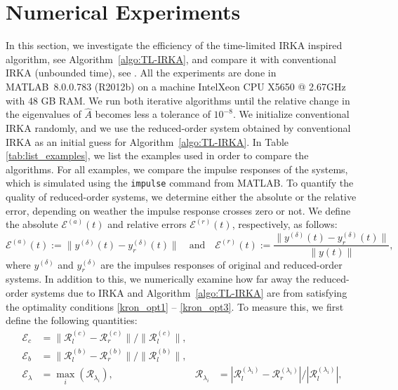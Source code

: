 \documentclass[a4paper,11pt, twoside]{article}
\newcommand{\hA}{\ensuremath{\hat{A}}}
\newcommand{\cE}{\ensuremath{\mathcal{E}}}
\newcommand{\matlab}{MATLAB\textsuperscript{\textregistered}}
\newcommand{\intel}{Intel\textsuperscript{\textregistered}}
\newcommand{\xeon}{Xeon\textsuperscript{\textregistered}}
\begin{document}
%

\section{Numerical Experiments}\label{sec:numericalsection}
In this section, we investigate the efficiency of the time-limited IRKA inspired algorithm, see Algorithm~\ref{algo:TL-IRKA}, and compare it 
with conventional IRKA (unbounded time), see \cite{morGugAB08}. All the experiments are done in \matlab~8.0.0.783 (R2012b) on a machine \intel\xeon 
CPU X5650 @ 2.67GHz with 48 GB RAM. We run both iterative algorithms until the relative change in the eigenvalues of $\hA$ becomes less a 
tolerance of $10^{-8}$. We initialize conventional IRKA randomly, and we use the reduced-order system obtained by conventional 
IRKA as an initial guess for Algorithm~\ref{algo:TL-IRKA}.  In Table \ref{tab:list_examples}, we list the examples used in order to compare the 
algorithms. For all examples, we compare the impulse responses of the systems, which is simulated using the \texttt{impulse} command from MATLAB. To 
quantify the quality of reduced-order systems, we determine either the absolute or the relative error, depending on weather the impulse response 
crosses zero or not. We define the absolute $\cE^{(a)}(t)$ and relative errors $\cE^{(r)}(t)$, respectively, as follows: 
\begin{equation}
\cE^{(a)}(t) := \|y^{(\delta)}(t) - y^{(\delta)}_r(t)\| \quad \text{and} \quad \cE^{(r)}(t) := \dfrac{\|y^{(\delta)}(t) - y^{(\delta)}_r(t)\|}{\|y(t)\|},
\end{equation}
where $y^{(\delta)}$ and $y^{(\delta)}_r$ are the impulses responses of original and reduced-order systems.  In addition to this, we numerically 
examine how far away the reduced-order systems due to IRKA and Algorithm~\ref{algo:TL-IRKA} are from satisfying the optimality conditions 
\eqref{kron_opt1} -- \eqref{kron_opt3}. To measure this, we first define the following quantities:
\begin{subequations}\label{eq:def_error}
\begin{align}
\mathcal E_c &= \|\mathcal R^{(c)}_{l}- \mathcal R^{(c)}_{r} \| /  \|\mathcal R^{(c)}_{l} \|,  \\
\mathcal E_b &= \|\mathcal R^{(b)}_{l}- \mathcal R^{(b)}_{r} \| /  \|\mathcal R^{(b)}_{l} \|, \\
\mathcal E_\lambda &= \max_{i}{(\mathcal R_{\lambda_{i}}) },  &\mathcal R_{\lambda_{i}} &= \left\vert\mathcal R^{(\lambda_i)}_{l}- \mathcal 
R^{(\lambda_i)}_{r} \right\vert /  \left\vert\mathcal  R^{(\lambda_i)}_{l} \right\vert,
\end{align}
\end{subequations}
\end{document}

